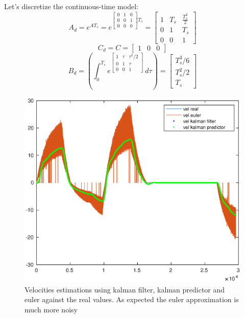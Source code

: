 \documentclass[a4paper,12pt]{article}
\begin{document}
\noindent Let's discretize the continuous-time model:
\[
    A_d = e^{AT_s} = e^{\begin{bmatrix}  0&1&0 \\ 0&0&1\\0&0&0 \end{bmatrix}T_s} = \begin{bmatrix} 1&T_s&\frac{T_s^2}{2}\\0&1&T_s\\0&0&1 \end{bmatrix}
\]
\[
    C_d = C = \begin{bmatrix} 1&0&0 \end{bmatrix}
\]
\[
    B_d = \left (\int_{0}^{T_s} e^{\begin{bmatrix} 1&\tau&\tau^2/2\\0&1&\tau\\0&0&1 \end{bmatrix}} \,d\tau \right) = \begin{bmatrix} T_s^3/6\\T_s^2/2\\T_s \end{bmatrix}
\]


\begin{figure}[H]
    \begin{center}
        \includegraphics[scale=0.7]{images/velocities.eps}
    \end{center}
    \caption{Velocities estimations using kalman filter, kalman predictor and euler against the real values. As expected the euler approximation is much more noisy}
    \label{fig:hw3_vel}
\end{figure}
\end{document}
